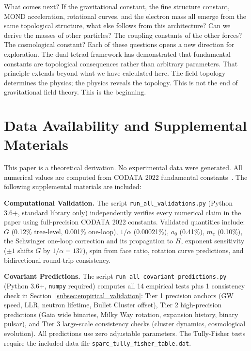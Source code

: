 \documentclass[aps,prd,preprint,superscriptaddress,showpacs,preprintnumbers,amsmath,amssymb,nofootinbib]{revtex4-2}
\begin{document}
What comes next? If the gravitational constant, the fine structure constant, MOND acceleration, rotational curves, and the electron mass all emerge from the same topological structure, what else follows from this architecture? Can we derive the masses of other particles? The coupling constants of the other forces? The cosmological constant? Each of these questions opens a new direction for exploration. The dual tetrad framework has demonstrated that fundamental constants are topological consequences rather than arbitrary parameters. That principle extends beyond what we have calculated here. The field topology determines the physics; the physics reveals the topology. This is not the end of gravitational field theory. This is the beginning.

\section*{Data Availability and Supplemental Materials}

This paper is a theoretical derivation. No experimental data were generated. All numerical values are computed from CODATA 2022 fundamental constants~\cite{codata2022}. The following supplemental materials are included:

\textbf{Computational Validation.}\quad
The script \texttt{run\_all\_validations.py} (Python 3.6+, standard library only) independently verifies every numerical claim in the paper using full-precision CODATA 2022 constants. Validated quantities include: $G$ (0.12\% tree-level, 0.001\% one-loop), $1/\alpha$ (0.00021\%), $a_0$ (0.41\%), $m_e$ (0.10\%), the Schwinger one-loop correction and its propagation to $H$, exponent sensitivity ($\pm 1$ shifts $G$ by $1/\alpha = 137$), spin from face ratio, rotation curve predictions, and bidirectional round-trip consistency.

\textbf{Covariant Predictions.}\quad
The script \texttt{run\_all\_covariant\_predictions.py} (Python 3.6+, \texttt{numpy} required) computes all 14 empirical tests plus 1 consistency check in Section~\ref{subsec:empirical_validation}: Tier 1 precision anchors (GW speed, LLR, neutron lifetime, Bullet Cluster offset), Tier 2 high-precision predictions (Gaia wide binaries, Milky Way rotation, expansion history, binary pulsar), and Tier 3 large-scale consistency checks (cluster dynamics, cosmological evolution). All predictions use zero adjustable parameters. The Tully-Fisher tests require the included data file \texttt{sparc\_tully\_fisher\_table.dat}.
\end{document}

